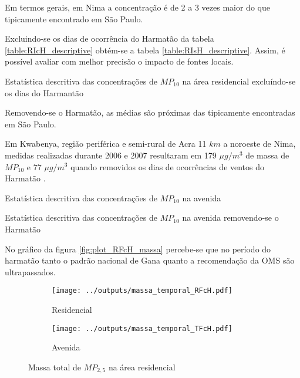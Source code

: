 Em termos gerais, em Nima a concentração é de 2 a 3 vezes maior do que 
tipicamente encontrado em São Paulo. 

Excluindo-se os dias de ocorrência do Harmatão da tabela 
\ref{table:RIcH_descriptive} obtém-se a tabela \ref{table:RIsH_descriptive}.
Assim, é possível avaliar com melhor precisão o impacto de fontes locais.  

\begin{table}[H]
  \centering
    
  \caption{Estatística descritiva das concentrações de  $MP_{10}$ na área 
           residencial excluíndo-se os dias do Harmantão
            \label{table:RIsH_descriptive}}
\end{table}

Removendo-se o Harmatão, as médias são próximas das tipicamente
encontradas em São Paulo. 

Em Kwabenya, região periférica e semi-rural de Acra 11 $km$ a noroeste de Nima, 
medidas realizadas durante 2006 e 2007 resultaram em 179 $\mu g / m^3$ de massa 
de $MP_{10}$ e 77 $\mu g / m^3$ quando removidos os dias de ocorrências
de ventos do Harmatão \citep{aboh2009}.

\begin{table}[H]
  \centering
    
  \caption{Estatística descritiva das concentrações de $MP_{10}$ na 
           avenida \label{table:TIcH_descriptive}}
\end{table}

\begin{table}[H]
  \centering
    
  \caption{Estatística descritiva das concentrações de $MP_{10}$ na 
           avenida removendo-se o Harmatão
           \label{table:TIsH_descriptive}}
\end{table}

No gráfico da figura \ref{fig:plot_RFcH_massa} percebe-se que no período 
do harmatão tanto o padrão nacional de Gana quanto a recomendação da OMS 
são ultrapassados.

\begin{figure}[H]
  \centering
  \begin{subfigure}[b]{0.45\textwidth}
    \texttt{[image: ../outputs/massa\_temporal\_RFcH.pdf]}
    \caption{Residencial}
  \end{subfigure}%
  \begin{subfigure}[b]{0.45\textwidth}
    \texttt{[image: ../outputs/massa\_temporal\_TFcH.pdf]}
    \caption{Avenida}
  \end{subfigure}
  \caption{Massa total de $MP_{2,5}$ na área residencial \label{fig:massa_temporal_fino}}
\end{figure}

